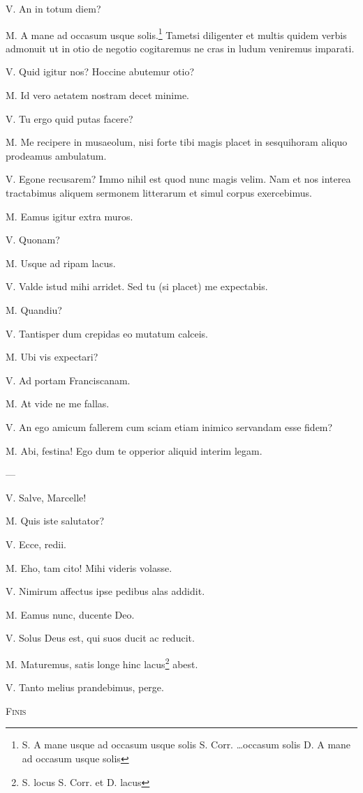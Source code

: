 \documentclass{article}
\begin{document}
V. An in totum diem?

M. A mane ad occasum usque solis.\footnote{S. A mane usque ad occasum usque solis S. Corr. \ldots occasum solis D. A mane ad occasum usque solis} Tametsi diligenter et multis quidem verbis admonuit ut in otio de negotio cogitaremus ne cras in ludum veniremus imparati.

V. Quid igitur nos? Hoccine abutemur otio?

M. Id vero aetatem nostram decet minime.

V. Tu ergo quid putas facere?

M. Me recipere in musaeolum, nisi forte tibi magis placet in sesquihoram aliquo prodeamus ambulatum.

V. Egone recusarem? Immo nihil est quod nunc magis velim. Nam et nos interea tractabimus aliquem sermonem litterarum et simul corpus exercebimus.

M. Eamus igitur extra muros.

V. Quonam?

M. Usque ad ripam lacus.

V. Valde istud mihi arridet. Sed tu (si placet) me expectabis.

M. Quandiu?

V. Tantisper dum crepidas eo mutatum calceis.

M. Ubi vis expectari?

V. Ad portam Franciscanam.

M. At vide ne me fallas.

V. An ego amicum fallerem cum sciam etiam inimico servandam esse fidem?

M. Abi, festina! Ego dum te opperior aliquid interim legam.

---

V. Salve, Marcelle!

M. Quis iste salutator?

V. Ecce, redii.

M. Eho, tam cito! Mihi videris volasse.

V. Nimirum affectus ipse pedibus alas addidit.

M. Eamus nunc, ducente Deo.

V. Solus Deus est, qui suos ducit ac reducit.

M. Maturemus, satis longe hinc lacus\footnote{S. locus S. Corr. et D. lacus} abest.

V. Tanto melius prandebimus, perge.

\begin{center}\textsc{Finis}\end{center}
\pagebreak
{}
{}
\end{document}
